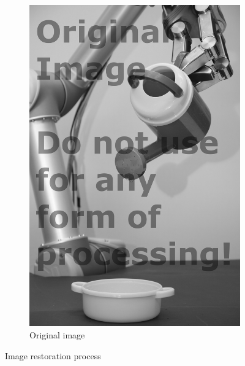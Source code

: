 \begin{figure}[H]
\begin{subfigure}[b]{0.24\textwidth}
        \includegraphics[width=\textwidth]{org.png}
        \caption{Original image\\[0.42cm]}
    \end{subfigure}   
    \caption{Image restoration process}
\end{figure}


